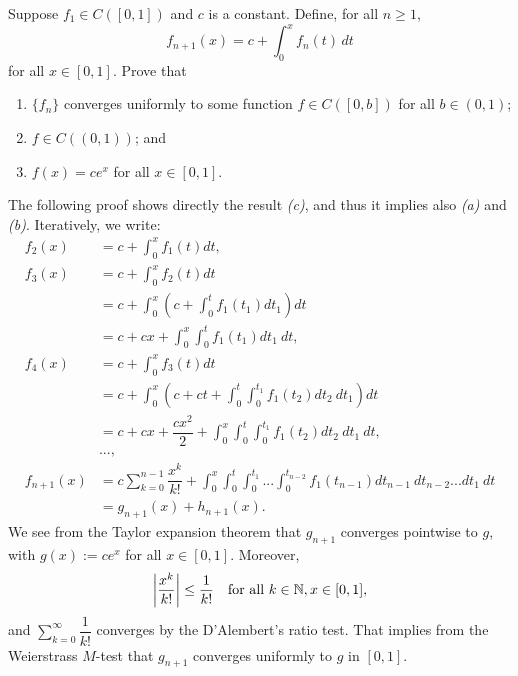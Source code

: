 \begin{problem}
Suppose $f_1 \in C([0,1])$ and $c$ is a constant. Define, for all $n \geq 1$,
$$ f_{n+1}(x) = c + \int_0^x f_n(t) \,dt $$
for all $x \in [0,1]$. Prove that
\begin{enumerate}
    \item[(a)] $\{f_n\}$ converges uniformly to some function $f \in C([0,b])$ for all $b \in (0,1)$;
    \item[(b)] $f \in C((0,1))$; and
    \item[(c)] $f(x) = ce^x$ for all $x \in [0,1]$.
\end{enumerate}
\begin{solution}
The following proof shows directly the result \textit{(c)}, and thus it implies also \textit{(a)} and \textit{(b)}. Iteratively, we write:
\begin{align*}
    f_2 (x) &= c + \int_0^x f_1(t)dt, \\
    f_3 (x) &= c + \int_0^x f_2 (t) dt \\
    &= c + \int_0^x \left( c + \int_0^t f_1 (t_1) dt_1 \right)dt \\
    &= c + cx + \int_0^x \int_0^t f_1 (t_1) dt_1\ dt,\\
    f_4 (x) &= c + \int_0^x f_3 (t) dt \\
    &= c + \int_0^x \left( c + ct + \int_0^t \int_0^{t_1} f_1 (t_2) dt_2\ dt_1 \right)dt  \\
    &= c + cx + \dfrac{cx^2}{2} + \int_0^x \int_0^{t}\int_0^{t_1} f_1 (t_2) dt_2 \ dt_1\ dt,\\
    &...,\\
    f_{n+1}(x) &= c\sum_{k=0}^{n-1} \dfrac{x^k}{k!} + \int_0^x \int_0^t \int_0^{t_1}...\int_0^{t_{n-2}} f_1(t_{n-1})dt_{n-1}\ dt_{n-2} ... dt_1\ dt \\
    &= g_{n+1}(x) + h_{n+1}(x).
\end{align*}
We see from the Taylor expansion theorem that $g_{n+1}$ converges pointwise to $g$, with $g(x):= c e^x$ for all $x\in [0,1]$. Moreover, 
\begin{align*}
    \left| \dfrac{x^k}{k!} \right| \le \dfrac{1}{k!}\ \ \text{ for all } k\in \mathbb{N}, x\in [0,1],
\end{align*}
and $\sum_{k=0}^{\infty}\dfrac{1}{k!}$ converges by the D'Alembert's ratio test. That implies from the Weierstrass $M$-test that $g_{n+1}$ converges uniformly to $g$ in $[0,1]$.\\


\end{solution}
\end{problem}

